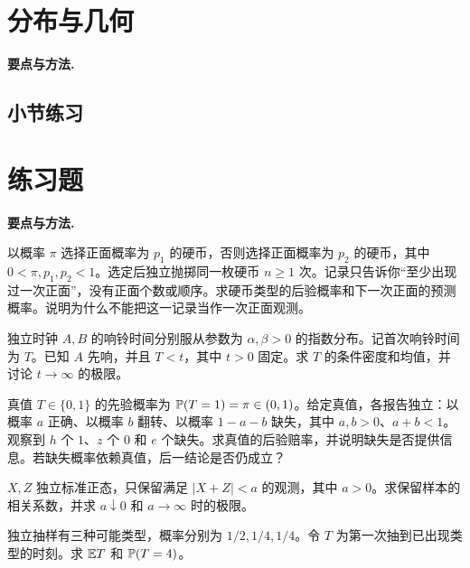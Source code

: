 \section{分布与几何}
\noindent\textbf{要点与方法.}\enspace














\par{}
\subsection*{小节练习}




\section{练习题}
\noindent\textbf{要点与方法.}\enspace



以概率 $\pi$ 选择正面概率为 $p_1$ 的硬币，否则选择正面概率为 $p_2$ 的硬币，其中 $0<\pi,p_1,p_2<1$。选定后独立抛掷同一枚硬币 $n\ge1$ 次。记录只告诉你“至少出现过一次正面”，没有正面个数或顺序。求硬币类型的后验概率和下一次正面的预测概率。说明为什么不能把这一记录当作一次正面观测。

独立时钟 $A,B$ 的响铃时间分别服从参数为 $\alpha,\beta>0$ 的指数分布。记首次响铃时间为 $T$。已知 $A$ 先响，并且 $T<t$，其中 $t>0$ 固定。求 $T$ 的条件密度和均值，并讨论 $t\to\infty$ 的极限。

真值 $T\in\{0,1\}$ 的先验概率为 $\mathbb{P}(T=1)=\pi\in(0,1)$。给定真值，各报告独立：以概率 $a$ 正确、以概率 $b$ 翻转、以概率 $1-a-b$ 缺失，其中 $a,b>0$、$a+b<1$。观察到 $h$ 个 $1$、$z$ 个 $0$ 和 $e$ 个缺失。求真值的后验赔率，并说明缺失是否提供信息。若缺失概率依赖真值，后一结论是否仍成立？

$X,Z$ 独立标准正态，只保留满足 $|X+Z|<a$ 的观测，其中 $a>0$。求保留样本的相关系数，并求 $a\downarrow0$ 和 $a\to\infty$ 时的极限。

独立抽样有三种可能类型，概率分别为 $1/2,1/4,1/4$。令 $T$ 为第一次抽到已出现类型的时刻。求 $\mathbb{E} T$ 和 $\mathbb{P}(T=4)$。

